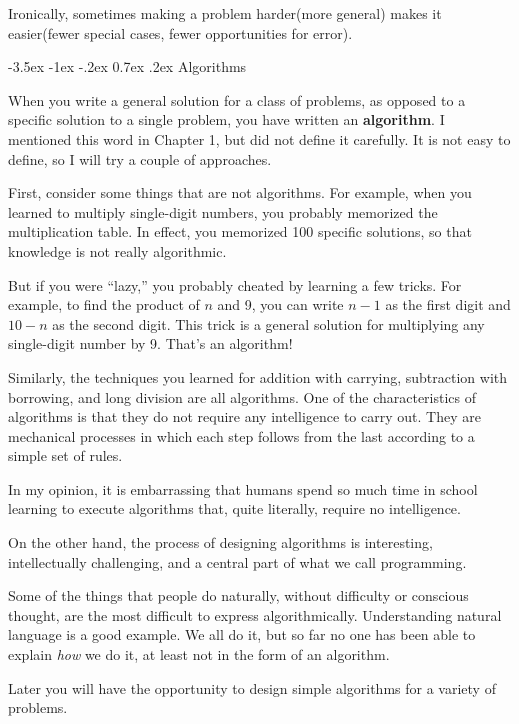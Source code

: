 \documentclass{book}
\makeatletter
\renewcommand{\section}{\@startsection 
    {section} {1} {0mm}%
    {-3.5ex \@plus -1ex \@minus -.2ex}%
    {0.7ex \@plus.2ex}%
    {\normalfont\Large\bfseries}}
\makeatother
\begin{document}
Ironically, sometimes making a problem harder(more general)
makes it easier(fewer special cases, fewer opportunities for error).

\section{Algorithms}
\label{algorithm}

When you write a general solution for a class of problems, as
opposed to a specific solution to a single problem, you have
written an {\bf algorithm}.  I mentioned this word in 
Chapter 1, but did not define it carefully.  It is
not easy to define, so I will try a couple of approaches.

First, consider some things that are not algorithms.  For example,
when you learned to multiply single-digit numbers, you probably
memorized the multiplication table.  In effect, you memorized 100
specific solutions, so that knowledge is not really algorithmic.

But if you were ``lazy,'' you probably cheated by learning a few
tricks.  For example, to find the product of $n$ and 9, you can
write $n-1$ as the first digit and $10-n$ as the second digit.  This
trick is a general solution for multiplying any single-digit number by 9.
That's an algorithm!

Similarly, the techniques you learned for addition with carrying,
subtraction with borrowing, and long division are all algorithms.  One
of the characteristics of algorithms is that they do not require any
intelligence to carry out.  They are mechanical processes in which
each step follows from the last according to a simple set of rules.

In my opinion, it is embarrassing that humans spend so much
time in school learning to execute algorithms that,
quite literally, require no intelligence.

On the other hand, the process of designing algorithms is
interesting, intellectually challenging, and a central part
of what we call programming.

Some of the things that people do naturally, without difficulty
or conscious thought, are the most difficult to express
algorithmically.  Understanding natural language is a good
example.  We all do it, but so far no one has been able to
explain {\em how} we do it, at least not in the form of an
algorithm.

Later you will have the opportunity to design
simple algorithms for a variety of problems.
\end{document}
